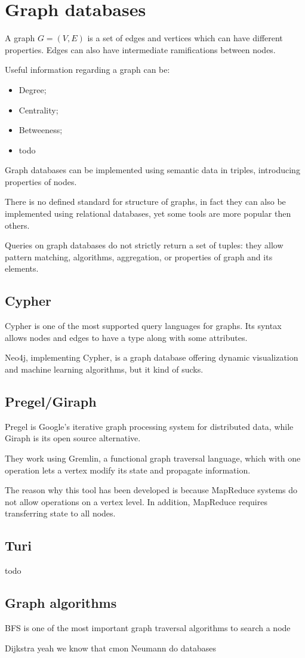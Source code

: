 \section{Graph databases}
A graph $G = (V, E)$ is a set of edges and vertices which can have different properties. Edges can also have intermediate ramifications between nodes.

Useful information regarding a graph can be:
\begin{itemize}
	\item Degree;
	\item Centrality;
	\item Betweeness;
	\item todo
\end{itemize}

Graph databases can be implemented using semantic data in triples, introducing properties of nodes.

There is no defined standard for structure of graphs, in fact they can also be implemented using relational databases, yet some tools are more popular then others. 

Queries on graph databases do not strictly return a set of tuples: they allow pattern matching, algorithms, aggregation, or properties of graph and its elements.

\subsection{Cypher}
Cypher is one of the most supported query languages for graphs. Its syntax allows nodes and edges to have a type along with some attributes.

Neo4j, implementing Cypher, is a graph database offering dynamic visualization and machine learning algorithms, but it kind of sucks.

\subsection{Pregel/Giraph}
Pregel is Google's iterative graph processing system for distributed data, while Giraph is its open source alternative.

They work using Gremlin, a functional graph traversal language, which with one operation lets a vertex modify its state and propagate information.

The reason why this tool has been developed is because MapReduce systems do not allow operations on a vertex level. In addition, MapReduce requires transferring state to all nodes.

\subsection{Turi}
todo

\subsection{Graph algorithms}
BFS is one of the most important graph traversal algorithms to search a node 

Dijkstra yeah we know that cmon Neumann do databases




